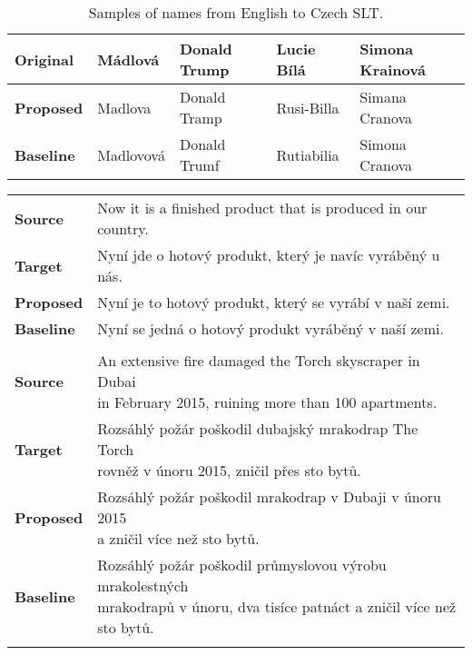 \begin{table}[]
	\centering
	\small
	\begin{tabular}{l|llll}
		\textbf{Original} & Mádlová & Donald Trump  & Lucie Bílá     & Simona Krainová       \\ \hline
		\textbf{Proposed} & Madlova     & Donald Tramp & Rusi-Billa      & Simana Cranova  \\
		\textbf{Baseline} & Madlovová    &  Donald Trumf   & Rutiabilia & Simona Cranova
	\end{tabular}
	\caption{Samples of names from English to Czech SLT.}
	\label{tab:en_cs_names}
\end{table}

\begin{table}[]
	\centering
	\begin{tabular}{ll}
		\multicolumn{1}{l|}{\textbf{Source}}   & Now it is a finished product that is produced in our country.      \\
		\multicolumn{1}{l|}{\textbf{Target}}   & Nyní jde o hotový produkt, který je navíc vyráběný u nás. \\
		\multicolumn{1}{l|}{\textbf{Proposed}} & Nyní je to hotový produkt, který se vyrábí v naší zemi.      \\
		\multicolumn{1}{l|}{\textbf{Baseline}} & Nyní se jedná o hotový produkt vyráběný v naší zemi.    \\
		\textbf{}                              &                                                           \\
		\multicolumn{1}{l|}{\textbf{Source}}   & \makecell[l]{An extensive fire damaged the Torch skyscraper in Dubai\\ in February 2015, ruining more than 100 apartments.}    \\
		\multicolumn{1}{l|}{\textbf{Target}}   & \makecell[l]{Rozsáhlý požár poškodil dubajský mrakodrap The Torch \\rovněž v únoru 2015, zničil přes sto bytů. }     \\
		\multicolumn{1}{l|}{\textbf{Proposed}} & \makecell[l]{Rozsáhlý požár poškodil mrakodrap v Dubaji v únoru 2015\\ a zničil více než sto bytů.   }              \\
		\multicolumn{1}{l|}{\textbf{Baseline}} & \makecell[l]{Rozsáhlý požár poškodil průmyslovou výrobu mrakolestných\\ mrakodrapů v únoru, dva tisíce patnáct a zničil více než sto bytů.     } \\
		\textbf{}                              &                                                           \\

\end{tabular}
\end{table}
